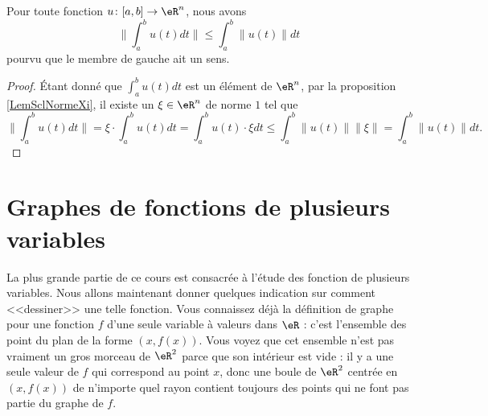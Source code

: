 \begin{lemma}			\label{LemIneqnormeintintnorm}
	Pour toute fonction $u\colon \mathopen[ a , b \mathclose]\to \eR^n$, nous avons
	\begin{equation}
		\| \int_a^bu(t)dt\|\leq\int_a^b\| u(t) \|dt
	\end{equation}
	pourvu que le membre de gauche ait un sens.
\end{lemma}

\begin{proof}
	Étant donné que $\int_a^bu(t)dt$ est un élément de $\eR^n$, par la proposition \ref{LemSclNormeXi}, il existe un $\xi\in\eR^n$ de norme $1$ tel que
	\begin{equation}
		\| \int_a^bu(t)dt \|=\xi\cdot\int_a^b u(t)dt=\int_a^b u(t)\cdot\xi dt\leq\int_a^b\| u(t) \|   \| \xi \|=\int_a^b\| u(t) \|dt.
	\end{equation}
\end{proof}

\section{Graphes de fonctions de plusieurs variables}		\label{SecGraphesFonc}

La plus grande partie de ce cours est consacrée à l'étude des fonction de plusieurs variables. Nous allons maintenant donner quelques indication sur comment <<dessiner>> une telle fonction. Vous connaissez déjà la définition de graphe pour une fonction $f$ d'une seule variable à valeurs dans $\eR$ : c'est l'ensemble des point du plan de la forme $(x, f(x))$. Vous voyez que cet ensemble n'est pas vraiment un gros morceau de $\eR^2$ parce que son intérieur est vide : il y a une seule valeur de $f$ qui correspond au point $x$, donc une boule de $\eR^2$ centrée en $(x, f(x))$ de n'importe quel rayon contient toujours des points qui ne font pas partie du graphe de $f$. 


